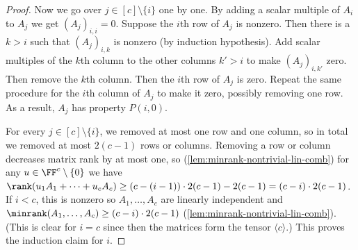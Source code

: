 \begin{proof}
Now we go over $j \in [c] \setminus \{i\}$ one by one. By adding a scalar multiple of $A_i$ to $A_j$ we get $(A_j)_{i,i} = 0$. Suppose the $i$th row of $A_j$ is nonzero. Then there is a $k>i$ such that $(A_j)_{i,k}$ is nonzero (by induction hypothesis). Add scalar multiples of the $k$th column to the other columns $k'>i$ to make $(A_j)_{i,k'}$ zero. Then remove the $k$th column. Then the $i$th row of $A_j$ is zero. Repeat the same procedure for the $i$th column of $A_j$ to make it zero, possibly removing one row. As a result, $A_j$ has property $P(i,0)$.

For every $j \in [c] \setminus \{i\}$, we removed at most one row and one column, so in total we removed at most $2(c-1)$ rows or columns. Removing a row or column decreases matrix rank by at most one, so (\autoref{lem:minrank-nontrivial-lin-comb})
for any $u\in\FF^{c}\setminus\{0\}$ we have $\rank(u_1A_1+\cdots+u_cA_c)\geq
(c-(i-1))\cdot 2(c-1) - 2(c-1) = (c-i)\cdot 2(c-1)$. 
If $i < c$, this is nonzero so $A_1, \ldots, A_c$ are linearly independent and $\minrank(A_1,\ldots,A_c) \geq (c-i)\cdot 2(c-1)$ (\autoref{lem:minrank-nontrivial-lin-comb}). (This is clear for $i=c$ since then the matrices form the tensor $\langle c\rangle$.) %
This proves the induction claim for $i$.
\end{proof}


